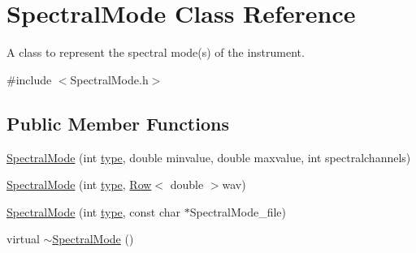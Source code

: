 \hypertarget{classSpectralMode}{
\section{SpectralMode Class Reference}
\label{classSpectralMode}
}


A class to represent the spectral mode(s) of the instrument.  




{\ttfamily \#include $<$SpectralMode.h$>$}

\subsection*{Public Member Functions}
\begin{DoxyCompactItemize}
\item 
\hyperlink{classSpectralMode_aa8c39bc91262a9fe5b840f10c41b301a}{SpectralMode} (int \hyperlink{classSpectralMode_a7720aa3a3f0d28c755169f86a3125d58}{type}, double minvalue, double maxvalue, int spectralchannels)
\item 
\hyperlink{classSpectralMode_a9511acf327e4119cbb9d10e6a24276d5}{SpectralMode} (int \hyperlink{classSpectralMode_a7720aa3a3f0d28c755169f86a3125d58}{type}, \hyperlink{classRow}{Row}$<$ double $>$wav)
\item 
\hyperlink{classSpectralMode_aab85eb7484d260cc3d4c76e2d44ee2d9}{SpectralMode} (int \hyperlink{classSpectralMode_a7720aa3a3f0d28c755169f86a3125d58}{type}, const char $\ast$SpectralMode\_\-file)
\item 
virtual \hyperlink{classSpectralMode_a8f6ff593021e7d0e175b528c94896a6b}{$\sim$SpectralMode} ()
\end{DoxyCompactItemize}
